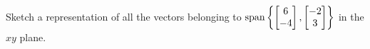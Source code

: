 \begin{applicationActivities}
\begin{activity}{5}
    Sketch a representation of all the vectors belonging to
    \(\operatorname{span}\left\{\begin{bmatrix}6\\-4\end{bmatrix},
     \begin{bmatrix}-2\\3\end{bmatrix}\right\}\)
    in the \(xy\) plane.
\end{activity}


\end{applicationActivities}
